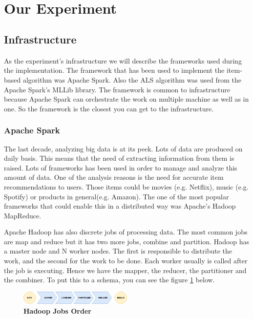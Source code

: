 \newpage
\section{Our Experiment}
\subsection{Infrastructure}
\paragraph{}As the experiment's infrastructure we will describe the frameworks used during the implementation. The framework that has been used to implement the item-based algorithm was Apache Spark. Also the ALS algorithm was used from the Apache Spark's MLLib library. The framework is common to infrastructure because Apache Spark can orchestrate the work on multiple machine as well as in one. So the framework is the closest you can get to the infrastructure.

\subsubsection{Apache Spark}
The last decade, analyzing big data is at its peek. Lots of data are produced on daily basis. This means that the need of extracting information from them is raised. 
Lots of frameworks has been used in order to manage and analyze this amount of data. One of the analysis reasons is the need for accurate item recommendations to users. Those items could be movies (e.g. Netflix), music (e.g. Spotify) or products in general(e.g. Amazon). The one of the most popular frameworks that could enable this in a distributed way was Apache's Hadoop MapReduce.


Apache Hadoop has also discrete jobs of processing data. The most common jobs are map and reduce but it has two more jobs, combine and partition. Hadoop has a master node and N worker nodes. The first is responsible to distribute the work, and the second for the work to be done. Each worker usually is called after the job is executing. Hence we have the mapper, the reducer, the partitioner and the combiner.
To put this to a schema, you can see the figure \ref{hadoopJobsOrder} below.

\begin{figure}[h]
	\centering
	\includegraphics[width=0.5\textwidth]{images/HadoopMapReduceProcesses.png}
	\caption{\bfseries Hadoop Jobs Order}
	\label{hadoopJobsOrder}
\end{figure}

